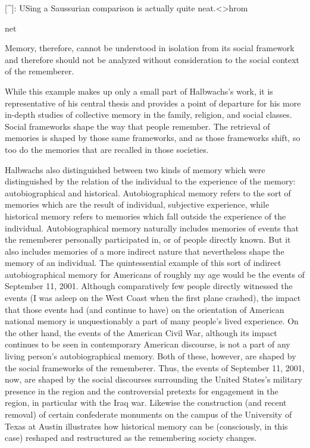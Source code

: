 {[}\^{}{]}: USing a Saussurian comparison is actually quite
neat.\textless{}\textgreater{}hrom

net

Memory, therefore, cannot be understood in isolation from its social
framework and therefore should not be analyzed without consideration to
the social context of the rememberer.

While this example makes up only a small part of Halbwachs's work, it is
representative of his central thesis and provides a point of departure
for his more in-depth studies of collective memory in the family,
religion, and social classes. Social frameworks shape the way that
people remember. The retrieval of memories is shaped by those same
frameworks, and as those frameworks shift, so too do the memories that
are recalled in those societies.

Halbwachs also distinguished between two kinds of memory which were
distinguished by the relation of the individual to the experience of the
memory: autobiographical and historical. Autobiographical memory refers
to the sort of memories which are the result of individual, subjective
experience, while historical memory refers to memories which fall
outside the experience of the individual. Autobiographical memory
naturally includes memories of events that the rememberer personally
participated in, or of people directly known. But it also includes
memories of a more indirect nature that nevertheless shape the memory of
an individual. The quintessential example of this sort of indirect
autobiographical memory for Americans of roughly my age would be the
events of September 11, 2001. Although comparatively few people directly
witnessed the events (I was asleep on the West Coast when the first
plane crashed), the impact that those events had (and continue to have)
on the orientation of American national memory is unquestionably a part
of many people's lived experience. On the other hand, the events of the
American Civil War, although its impact continues to be seen in
contemporary American discourse, is not a part of any living person's
autobiographical memory.\autocite[19]{olick_olick-etal2011} Both of
these, however, are shaped by the social frameworks of the rememberer.
Thus, the events of September 11, 2001, now, are shaped by the social
discourses surrounding the United States's military presence in the
region and the controversial pretexts for engagement in the region, in
particular with the Iraq war. Likewise the construction (and recent
removal) of certain confederate monuments on the campus of the
University of Texas at Austin illustrates how historical memory can be
(consciously, in this case) reshaped and restructured as the remembering
society changes.

